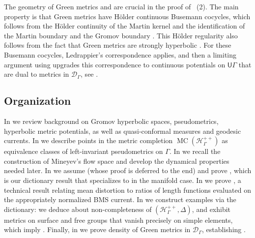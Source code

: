 \documentclass[twoside]{amsart}
\theoremstyle{definition}
\numberwithin{equation}{section}
\numberwithin{theorem}{section}
\newcommand{\msf}[1]{\mathsf{#1}}
\newcommand{\calD}{\mathcal{D}}
\newcommand{\scrD}{\mathscr{D}}
\newcommand{\scrH}{\mathscr{H}}
\newcommand{\G}{\Gamma}
\newcommand{\Del}{\Delta}
\newcommand{\UG}{\msf{U}\G}
\DeclareMathOperator{\MC}{MC}
\begin{document}
The geometry of Green metrics and  are crucial in the proof of ~(2). The main property is that Green metrics have H\"older continuous Busemann cocycles, which follows from the H\"older continuity of the Martin kernel \cite[Theorem~3.3]{INO} and the identification of the Martin boundary and the Gromov boundary \cite[Theorem~1.7]{BHM.harmonic}. This H\"older regularity also follows from the fact that Green metrics are strongly hyperbolic \cite{nica-spakula}. For these Busemann cocycles, Ledrappier's correspondence applies, and then a limiting argument using  upgrades this correspondence to continuous potentials on $\UG$ that are dual to metrics in $\calD_\G$, see .















\subsection*{Organization}

In  we review background on Gromov hyperbolic spaces, pseudometrics, hyperbolic metric potentials, 
as well as quasi-conformal measures and geodesic currents. In  we describe points in the metric completion $\MC(\scrH_\G^{++})$ as equivalence classes of left-invariant pseudometrics on $\G$. In  we recall the construction of Mineyev’s flow space and develop the dynamical properties needed later. In  we assume 
(whose proof is deferred to the end) and prove , which is our dictionary result that specializes to  in the manifold case. In  we prove , a technical result relating mean distortion to ratios of length functions evaluated on the appropriately normalized BMS current. In  we construct examples via the dictionary: we deduce  about non-completeness of $(\scrH_\G^{++},\Del)$, and exhibit metrics on surface and free groups that vanish precisely on simple elements, which imply  .
Finally, in  we prove density of Green metrics in $\scrD_\G$, establishing .
\end{document}
